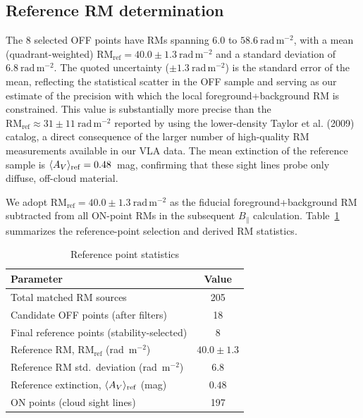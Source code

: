 \documentclass[twocolumn]{aastex631}
\begin{document}
\subsection{Reference RM determination}

The 8 selected OFF points have RMs spanning $6.0$ to $58.6~\mathrm{rad\,m^{-2}}$, with a mean (quadrant-weighted) $\mathrm{RM_{ref}} = 40.0 \pm 1.3~\mathrm{rad\,m^{-2}}$ and a standard deviation of $6.8~\mathrm{rad\,m^{-2}}$. The quoted uncertainty ($\pm 1.3~\mathrm{rad\,m^{-2}}$) is the standard error of the mean, reflecting the statistical scatter in the OFF sample and serving as our estimate of the precision with which the local foreground+background RM is constrained. This value is substantially more precise than the $\mathrm{RM_{ref}} \approx 31 \pm 11~\mathrm{rad\,m^{-2}}$ reported by \citet{tahani2018} using the lower-density Taylor et al. (2009) catalog, a direct consequence of the larger number of high-quality RM measurements available in our VLA data. The mean extinction of the reference sample is $\langle A_V \rangle_{\rm ref} = 0.48$~mag, confirming that these sight lines probe only diffuse, off-cloud material.

We adopt $\mathrm{RM_{ref}} = 40.0 \pm 1.3~\mathrm{rad\,m^{-2}}$ as the fiducial foreground+background RM subtracted from all ON-point RMs in the subsequent $B_\parallel$ calculation. Table~\ref{tab:reference-statistics} summarizes the reference-point selection and derived RM statistics.

\begin{table}[htbp]
\centering
\caption{Reference point statistics}
\label{tab:reference-statistics}
\begin{tabular}{lc}
\toprule
Parameter & Value \\
\midrule
Total matched RM sources & 205 \\
Candidate OFF points (after filters) & 18 \\
Final reference points (stability-selected) & 8 \\
\midrule
Reference RM, $\mathrm{RM_{ref}}$ (rad~m$^{-2}$) & $40.0 \pm 1.3$ \\
Reference RM std.\ deviation (rad~m$^{-2}$) & $6.8$ \\
Reference extinction, $\langle A_V \rangle_{\rm ref}$ (mag) & $0.48$ \\
\midrule
ON points (cloud sight lines) & 197 \\
\bottomrule
\end{tabular}
\end{table}
\end{document}
